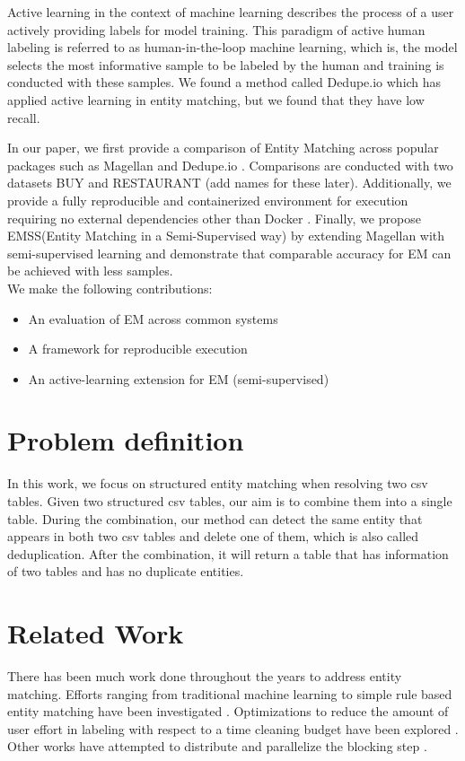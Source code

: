 \documentclass[letterpaper,twocolumn,10pt]{article}
\begin{document}
Active learning in the context of machine learning describes the process of a user actively providing labels for model training. This paradigm of active human labeling is referred to as human-in-the-loop machine learning, which is, the model selects the most informative sample to be labeled by the human and training is conducted with these samples. We found a method called Dedupe.io which has applied active learning in entity matching, but we found that they have low recall. 

In our paper, we first provide a comparison of Entity Matching across popular packages such as Magellan and Dedupe.io \cite{bilenko2004learnable, konda2016magellan}. Comparisons are conducted with two datasets BUY and RESTAURANT (add names for these later). Additionally, we provide a fully reproducible and containerized environment for execution requiring no external dependencies other than Docker \cite{docker:2014}. Finally, we propose EMSS(Entity Matching in a Semi-Supervised way) by extending Magellan with semi-supervised learning and demonstrate that comparable accuracy for EM can be achieved with less samples.
\\

We make the following contributions:
\begin{itemize}
  \item An evaluation of EM across common systems
  \item A framework for reproducible execution
  \item An active-learning extension for EM (semi-supervised)
\end{itemize}

\section{Problem definition}
In this work, we focus on structured entity matching when resolving two csv tables. Given two structured csv tables, our aim is to combine them into a single table. During the combination, our method can detect the same entity that appears in both two csv tables and delete one of them, which is also called deduplication. After the combination, it will return a table that has information of two tables and has no duplicate entities.

\section{Related Work}
There has been much work done throughout the years to address entity matching. Efforts ranging from traditional machine learning to simple rule based entity matching have been investigated \cite{kopcke2010frameworks, fan2014emdr, elmagarmid2007survey}. Optimizations to reduce the amount of user effort in labeling with respect to a time cleaning budget have been explored \cite{ao2019cleaningem}. Other works have attempted to distribute and parallelize the blocking step \cite{chu2016distributed}. 
\end{document}
